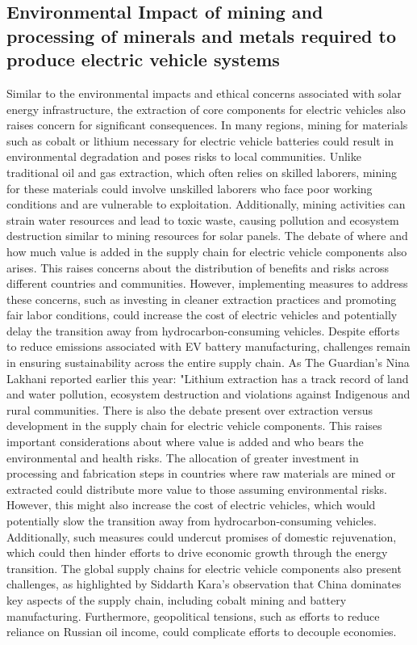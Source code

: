 \documentclass[10pt,twocolumn]{article}
\begin{document}
\subsection{Environmental Impact of mining and processing of minerals and metals required to produce electric vehicle systems}
Similar to the environmental impacts and ethical concerns associated with solar energy infrastructure, the extraction of core components for electric vehicles also raises concern for significant consequences. In many regions, mining for materials such as cobalt or lithium necessary for electric vehicle batteries could result in environmental degradation and poses risks to local communities. Unlike traditional oil and gas extraction, which often relies on skilled laborers, mining for these materials could involve unskilled laborers who face poor working conditions and are vulnerable to exploitation. Additionally, mining activities can strain water resources and lead to toxic waste, causing pollution and ecosystem destruction similar to mining resources for solar panels. The debate of where and how much value is added in the supply chain for electric vehicle components also arises. This raises concerns about the distribution of benefits and risks across different countries and communities. However, implementing measures to address these concerns, such as investing in cleaner extraction practices and promoting fair labor conditions, could increase the cost of electric vehicles and potentially delay the transition away from hydrocarbon-consuming vehicles. Despite efforts to reduce emissions associated with EV battery manufacturing, challenges remain in ensuring sustainability across the entire supply chain. As The Guardian's Nina Lakhani reported earlier this year: "Lithium extraction has a track record of land and water pollution, ecosystem destruction and violations against Indigenous and rural communities. There is also the  debate present over extraction versus development in the supply chain for electric vehicle components. This raises important considerations about where value is added and who bears the environmental and health risks. The allocation of greater investment in processing and fabrication steps in countries where raw materials are mined or extracted could distribute more value to those assuming environmental risks. However, this might also increase the cost of electric vehicles, which would potentially slow the transition away from hydrocarbon-consuming vehicles. Additionally, such measures could undercut promises of domestic rejuvenation, which could then hinder efforts to drive economic growth through the energy transition. The global supply chains for electric vehicle components also present challenges, as highlighted by Siddarth Kara's observation that China dominates key aspects of the supply chain, including cobalt mining and battery manufacturing. Furthermore, geopolitical tensions, such as efforts to reduce reliance on Russian oil income, could complicate efforts to decouple economies. 
\end{document}
